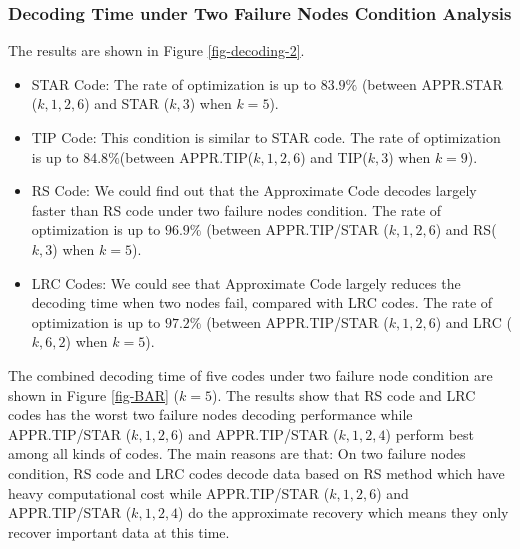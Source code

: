 \documentclass[sigconf]{acmart}
\begin{document}
\subsubsection{Decoding Time under Two Failure Nodes Condition Analysis}
The results are shown in Figure \ref{fig-decoding-2}.
\begin{itemize}
    \item STAR Code: The rate of optimization is up to $83.9\%$ (between APPR.STAR ($k,1,2,6$) and STAR ($k,3$) when $k = 5$).
    \item TIP Code: This condition is similar to STAR code. The rate of optimization is up to $84.8\% $(between APPR.TIP($k,1,2,6$) and TIP($k,3$) when $k = 9$).
    \item RS Code: We could find out that the Approximate Code decodes largely faster than RS code under two failure nodes condition. The rate of optimization is up to $96.9\%$ (between APPR.TIP/STAR ($k,1,2,6$) and RS($k,3$) when $k = 5$).
    \item LRC Codes:
    We could see that Approximate Code largely reduces the decoding time when two nodes fail, compared with LRC codes. The rate of optimization is up to $97.2\%$ (between APPR.TIP/STAR ($k,1,2,6$) and LRC ($k, 6, 2$) when $k = 5$).
\end{itemize}

The combined decoding time of five codes under two failure node condition are shown in Figure \ref{fig-BAR} ($k=5$). The results show that RS code and LRC codes has the worst two failure nodes decoding performance while APPR.TIP/STAR ($k,1,2,6$) and APPR.TIP/STAR ($k,1,2,4$) perform best among all kinds of codes. The main reasons are that: On two failure nodes condition, RS code and LRC codes decode data based on RS method which have heavy computational cost while APPR.TIP/STAR ($k,1,2,6$) and APPR.TIP/STAR ($k,1,2,4$) do the approximate recovery which means they only recover important data at this time.
\end{document}
